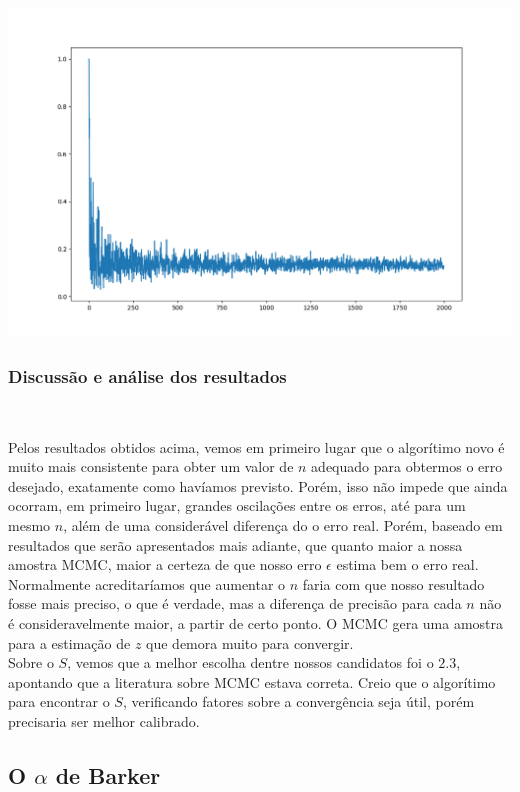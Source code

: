 \documentclass[pt12]{article}
\begin{document}
\includegraphics[scale=0.4]{ConvergZ_M_3.png}

\subsubsection{Discussão e análise dos resultados}
\ 

Pelos resultados obtidos acima, vemos em primeiro lugar que o algorítimo novo é muito mais consistente para obter um valor de $n$ adequado para obtermos o erro desejado, exatamente como havíamos previsto. Porém, isso não impede que ainda ocorram, em primeiro lugar, grandes oscilações entre os erros, até para um mesmo $n$, além de uma considerável diferença do o erro real. Porém, baseado em resultados que serão apresentados mais adiante, que quanto maior a nossa amostra MCMC, maior a certeza de que nosso erro $\epsilon$ estima bem o erro real. Normalmente acreditaríamos que aumentar o $n$ faria com que nosso resultado fosse mais preciso, o que é verdade, mas a diferença de precisão para cada $n$ não é consideravelmente maior, a partir de certo ponto. O MCMC gera uma amostra para a estimação de $z$ que demora muito para convergir.\\

Sobre o $S$, vemos que a melhor escolha dentre nossos candidatos foi o $2.3$, apontando que a literatura sobre MCMC estava correta. Creio que o algorítimo para encontrar o $S$, verificando fatores sobre a convergência seja útil, porém precisaria ser melhor calibrado.

\subsection{O $\alpha$ de Barker}
\ 
\end{document}
